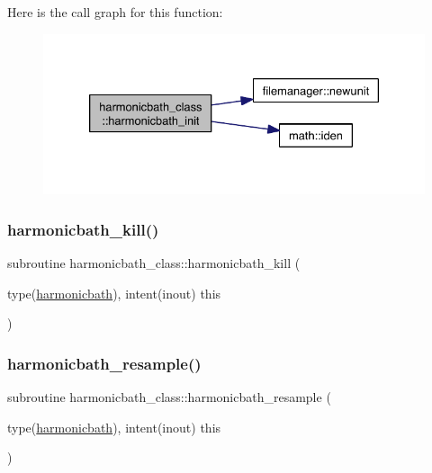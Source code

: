Here is the call graph for this function\+:\nopagebreak
\begin{figure}[H]
\begin{center}
\leavevmode
\includegraphics[width=330pt]{namespaceharmonicbath__class_a7d869bb99a49aa520fe606e808d5feb5_cgraph}
\end{center}
\end{figure}
\mbox{\label{namespaceharmonicbath__class_ae4e0e1b027594bb77034f21e82f6ed63}} 
\subsubsection{\texorpdfstring{harmonicbath\+\_\+kill()}{harmonicbath\_kill()}}
{\footnotesize\ttfamily subroutine harmonicbath\+\_\+class\+::harmonicbath\+\_\+kill (\begin{DoxyParamCaption}\item[{type(\hyperlink{structharmonicbath__class_1_1harmonicbath}{harmonicbath}), intent(inout)}]{this }\end{DoxyParamCaption})\hspace{0.3cm}{\ttfamily [private]}}

\mbox{\label{namespaceharmonicbath__class_a6b27afcc7c1f24fec82adf3177d0adb8}} 
\subsubsection{\texorpdfstring{harmonicbath\+\_\+resample()}{harmonicbath\_resample()}}
{\footnotesize\ttfamily subroutine harmonicbath\+\_\+class\+::harmonicbath\+\_\+resample (\begin{DoxyParamCaption}\item[{type(\hyperlink{structharmonicbath__class_1_1harmonicbath}{harmonicbath}), intent(inout)}]{this }\end{DoxyParamCaption})\hspace{0.3cm}{\ttfamily [private]}}

